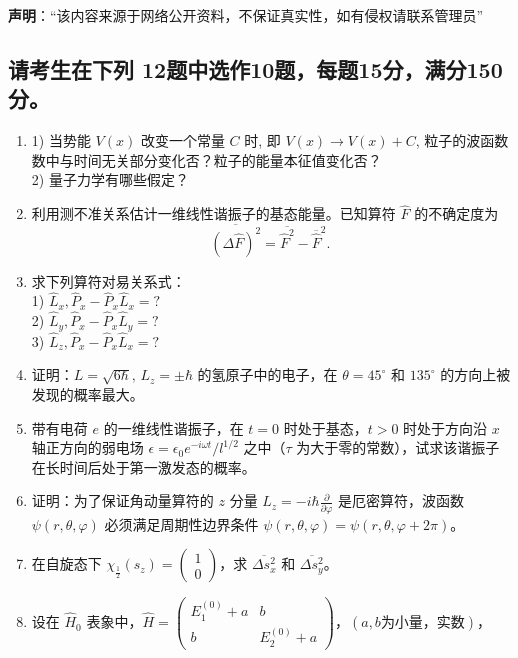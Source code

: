
\textbf{声明}：“该内容来源于网络公开资料，不保证真实性，如有侵权请联系管理员”

\subsection{请考生在下列 12题中选作10题，每题15分，满分150分。}
\begin{enumerate}
    \item 1) 当势能 $V(x)$ 改变一个常量 $C$ 时, 即 $V(x) \rightarrow V(x) + C$, 粒子的波函数数中与时间无关部分变化否？粒子的能量本征值变化否？\\
   2) 量子力学有哪些假定？
    \item 利用测不准关系估计一维线性谐振子的基态能量。已知算符 $\hat{F}$ 的不确定度为
    \[
    \overline{(\Delta \hat{F})^2} = \overline{\hat{F}^2}-  \overline{\hat{F}} ^2.~
    \]
    \item 求下列算符对易关系式：\\
    1) $\hat{L}_x, \hat{P}_x - \hat{P}_x \hat{L}_x=?$\\
    2) $\hat{L}_y, \hat{P}_x - \hat{P}_x \hat{L}_y=?$\\
    3) $\hat{L}_z, \hat{P}_x - \hat{P}_x \hat{L}_x=?$\\
    \item 证明：$L = \sqrt{6\hbar}, \, L_z = \pm \hbar$ 的氢原子中的电子，在 $\theta = 45^\circ$ 和 $135^\circ$ 的方向上被发现的概率最大。
    \item 带有电荷 $e$ 的一维线性谐振子，在 $t = 0$ 时处于基态，$t > 0$ 时处于方向沿 $x$ 轴正方向的弱电场 $\epsilon = \epsilon_0 e^{-i\omega t}/l^{1/2}$ 之中（$\tau$ 为大于零的常数），试求该谐振子在长时间后处于第一激发态的概率。
    \item 证明：为了保证角动量算符的 $z$ 分量 $L_z = -i\hbar \frac{\partial}{\partial \varphi}$ 是厄密算符，波函数 $\psi(r, \theta, \varphi)$ 必须满足周期性边界条件 $\psi(r, \theta, \varphi) = \psi(r, \theta, \varphi + 2\pi)$。
    \item 在自旋态下 $\chi_{\frac{1}{2}}(s_z) = \begin{pmatrix} 1 \\ 0 \end{pmatrix}$，求 $\overline{\Delta s_x^2}$ 和 $\overline{\Delta s_y^2}$。
    \item 设在 $\hat H_0$ 表象中，$\hat{H} = \begin{pmatrix} E_1^{(0)} + a & b \\ b & E_2^{(0)} + a \end{pmatrix}$，$(a, b \text{为小量，实数})$，\\\\

\end{enumerate}
